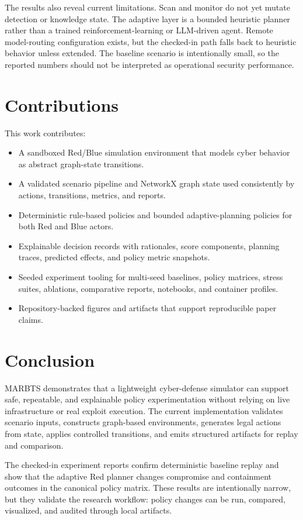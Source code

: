 \documentclass[conference]{IEEEtran}
\begin{document}
The results also reveal current limitations. Scan and monitor do not yet mutate detection or knowledge state. The adaptive layer is a bounded heuristic planner rather than a trained reinforcement-learning or LLM-driven agent. Remote model-routing configuration exists, but the checked-in path falls back to heuristic behavior unless extended. The baseline scenario is intentionally small, so the reported numbers should not be interpreted as operational security performance.

\section{Contributions}
This work contributes:

\begin{itemize}
    \item A sandboxed Red/Blue simulation environment that models cyber behavior as abstract graph-state transitions.
    \item A validated scenario pipeline and NetworkX graph state used consistently by actions, transitions, metrics, and reports.
    \item Deterministic rule-based policies and bounded adaptive-planning policies for both Red and Blue actors.
    \item Explainable decision records with rationales, score components, planning traces, predicted effects, and policy metric snapshots.
    \item Seeded experiment tooling for multi-seed baselines, policy matrices, stress suites, ablations, comparative reports, notebooks, and container profiles.
    \item Repository-backed figures and artifacts that support reproducible paper claims.
\end{itemize}

\section{Conclusion}
MARBTS demonstrates that a lightweight cyber-defense simulator can support safe, repeatable, and explainable policy experimentation without relying on live infrastructure or real exploit execution. The current implementation validates scenario inputs, constructs graph-based environments, generates legal actions from state, applies controlled transitions, and emits structured artifacts for replay and comparison.

The checked-in experiment reports confirm deterministic baseline replay and show that the adaptive Red planner changes compromise and containment outcomes in the canonical policy matrix. These results are intentionally narrow, but they validate the research workflow: policy changes can be run, compared, visualized, and audited through local artifacts.
\end{document}
